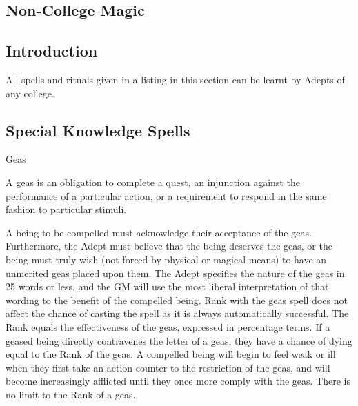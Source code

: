 \begin{multicols}{3}

\section{Non-College Magic}
\label{rituals:noncollege}

\subsection{Introduction}

All spells and rituals given in a listing in this section can be
learnt by Adepts of any college.

\subsection{Special Knowledge Spells}

\begin{spell}[]{Geas}

\begin{effects}
A geas is an obligation to complete a quest, an injunction against the
performance of a particular action, or a requirement to respond in the
same fashion to particular stimuli.

A being to be compelled must acknowledge their acceptance of the geas.
Furthermore, the Adept must believe that the being deserves the geas,
or the being must truly wish (not forced by physical or magical means)
to have an unmerited geas placed upon them.  The Adept specifies the
nature of the geas in 25 words or less, and the GM will use the most
liberal interpretation of that wording to the benefit of the compelled
being.  Rank with the geas spell does not affect the chance of casting
the spell as it is always automatically successful.  The Rank equals
the effectiveness of the geas, expressed in percentage terms.  If a
geased being directly contravenes the letter of a geas, they have a
chance of dying equal to the Rank of the geas.  A compelled being will
begin to feel weak or ill when they first take an action counter to
the restriction of the geas, and will become increasingly afflicted
until they once more comply with the geas.  There is no limit to the
Rank of a geas.


\end{effects}
\end{spell}
\end{multicols}
